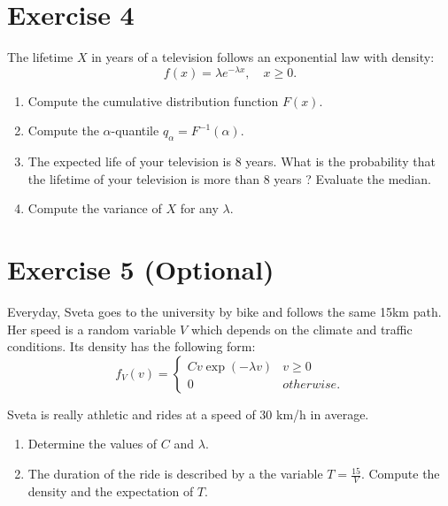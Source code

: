 \documentclass[12pt,thmsa]{article}\usepackage[]{graphicx}\usepackage[]{color}
\begin{document}
\section*{Exercise 4}

The lifetime $X$ in years of a television follows an exponential law with density:
\begin{equation*}
f(x)=\lambda e^{-\lambda x} ,\quad x\geq 0.
\end{equation*}
\begin{enumerate}
  \item Compute the cumulative distribution function $F(x)$.
  \item Compute the $\alpha$-quantile $q_\alpha=F^{-1}(\alpha)$.
  \item The expected life of your television is $8$ years. What is the probability that the lifetime of your television is more than $8$ years ?
  Evaluate the median.
  \item Compute the variance of $X$ for any $\lambda$.
\end{enumerate}


\section*{Exercise 5 (Optional)}
Everyday, Sveta goes to the university by bike and follows the same 15km path. Her speed is a random variable $V$ which depends on the climate and traffic conditions.
Its density has the following form:
\begin{equation*}
f_V(v)= \left\{
    \begin{array}{ll}
        C v \exp(-\lambda v) &  v\geq 0 \\
        0 & otherwise.
    \end{array}
\right.
\end{equation*}

Sveta is really athletic and rides at a speed of 30 km/h in average.
\begin{enumerate}
  \item Determine the values of $C$ and $\lambda$.
  \item The duration of the ride is described by a the variable $T= \frac{15}{V}$.
  Compute the density and the expectation of $T$.
\end{enumerate}
\end{document}
